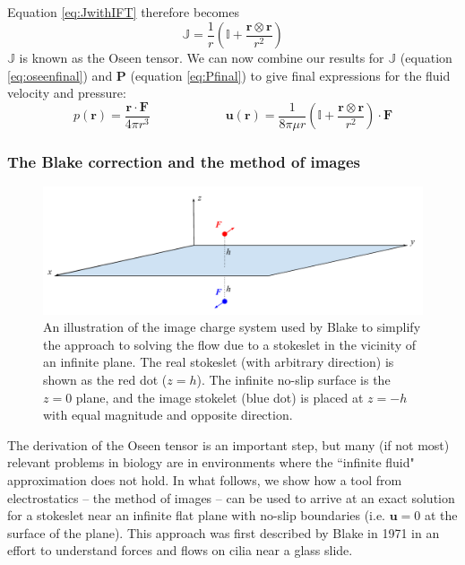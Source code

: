 \documentclass[11pt]{ucthesis}
\begin{document}
Equation \ref{eq:JwithIFT} therefore becomes
\begin{equation}
\label{eq:oseenfinal}
\mathbb{J} = \frac1r\left(\mathbb{I} + \frac{\mathbf{r\otimes r}}{r^2}\right)
\end{equation}
$\mathbb{J}$ is known as the Oseen tensor. We can now combine our results for $\mathbb{J}$ (equation \ref{eq:oseenfinal}) and $\mathbf{P}$ (equation \ref{eq:Pfinal}) to give final expressions for the fluid velocity and pressure:
\begin{equation}
\label{eq:vp_free}
p(\mathbf{r}) = \frac{\mathbf{r\cdot F}}{4\pi r^3}\qquad\qquad\qquad \mathbf{u(r)} = \frac{1}{8\pi \mu r }\left(\mathbb{I} + \frac{\mathbf{r\otimes r}}{r^2}\right)\cdot\mathbf{F} 
\end{equation}


\subsubsection{The Blake correction and the method of images}
\label{sec:blaketensor}

\begin{figure}
\centering
\includegraphics[width=\textwidth]{blake_img}
\caption{An illustration of the image charge system used by Blake to simplify the approach to solving the flow due to a stokeslet in the vicinity of an infinite plane. The real stokeslet (with arbitrary direction) is shown as the red dot ($z=h$). The infinite no-slip surface is the $z=0$ plane, and the image stokelet (blue dot) is placed at $z=-h$ with equal magnitude and opposite direction. \label{fig:blake_img}}
\end{figure}

The derivation of the Oseen tensor is an important step, but many (if not most) relevant problems in biology are in environments where the ``infinite fluid" approximation does not hold. In what follows, we show how a tool from electrostatics -- the method of images -- can be used to arrive at an exact solution for a stokeslet near an infinite flat plane with no-slip boundaries (i.e. $\mathbf{u} = 0$ at the surface of the plane). This approach was first described by Blake in 1971 \cite{Blake1971} in an effort to understand forces and flows on cilia near a glass slide.
\end{document}
